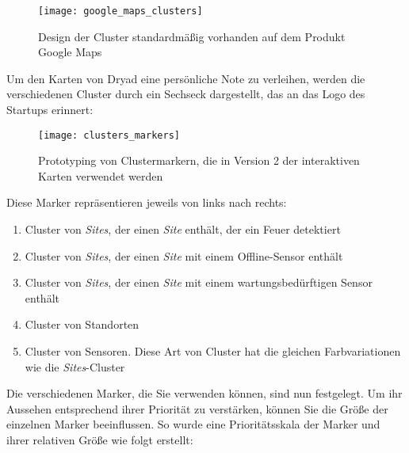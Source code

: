 \begin{figure}[H]
  \centering
  \texttt{[image: google\_maps\_clusters]}
  \caption{Design der Cluster standardmäßig vorhanden auf dem Produkt Google Maps}
  \label{fig:google_maps_clusters}
\end{figure}

Um den Karten von Dryad eine persönliche Note zu verleihen, werden die verschiedenen Cluster durch ein Sechseck dargestellt, das an das Logo des Startups erinnert:

\begin{figure}[H]
  \centering
  \texttt{[image: clusters\_markers]}
  \caption{Prototyping von Clustermarkern, die in Version 2 der interaktiven Karten verwendet werden}
  \label{fig:clusters_markers}
\end{figure}

Diese Marker repräsentieren jeweils von links nach rechts:

\begin{enumerate}
  \item Cluster von \textit{Sites}, der einen \textit{Site} enthält, der ein Feuer detektiert
  \item Cluster von \textit{Sites}, der einen \textit{Site} mit einem Offline-Sensor enthält
  \item Cluster von \textit{Sites}, der einen \textit{Site} mit einem wartungsbedürftigen Sensor enthält
  \item Cluster von Standorten
  \item Cluster von Sensoren. Diese Art von Cluster hat die gleichen Farbvariationen wie die \textit{Sites}-Cluster
\end{enumerate}

Die verschiedenen Marker, die Sie verwenden können, sind nun festgelegt.
Um ihr Aussehen entsprechend ihrer Priorität zu verstärken, können Sie die Größe der einzelnen Marker beeinflussen.
So wurde eine Prioritätsskala der Marker und ihrer relativen Größe wie folgt erstellt:

